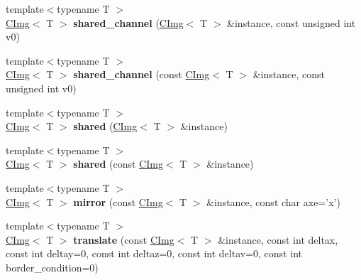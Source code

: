 \begin{DoxyCompactItemize}
\item 
\hypertarget{namespacecimg__library_a3cf8798c4859b85adbf80642a5ea70a3}{{\footnotesize template$<$typename T $>$ }\\\hyperlink{structcimg__library_1_1_c_img}{C\-Img}$<$ T $>$ {\bfseries shared\-\_\-channel} (\hyperlink{structcimg__library_1_1_c_img}{C\-Img}$<$ T $>$ \&instance, const unsigned int v0)}\label{namespacecimg__library_a3cf8798c4859b85adbf80642a5ea70a3}

\item 
\hypertarget{namespacecimg__library_a1eab13b0425b40f92a78431ef40ba42f}{{\footnotesize template$<$typename T $>$ }\\\hyperlink{structcimg__library_1_1_c_img}{C\-Img}$<$ T $>$ {\bfseries shared\-\_\-channel} (const \hyperlink{structcimg__library_1_1_c_img}{C\-Img}$<$ T $>$ \&instance, const unsigned int v0)}\label{namespacecimg__library_a1eab13b0425b40f92a78431ef40ba42f}

\item 
\hypertarget{namespacecimg__library_aaa0930fc6ee428defac1c96c777bc59a}{{\footnotesize template$<$typename T $>$ }\\\hyperlink{structcimg__library_1_1_c_img}{C\-Img}$<$ T $>$ {\bfseries shared} (\hyperlink{structcimg__library_1_1_c_img}{C\-Img}$<$ T $>$ \&instance)}\label{namespacecimg__library_aaa0930fc6ee428defac1c96c777bc59a}

\item 
\hypertarget{namespacecimg__library_a31792efab06c072bcdba1694dc474ace}{{\footnotesize template$<$typename T $>$ }\\\hyperlink{structcimg__library_1_1_c_img}{C\-Img}$<$ T $>$ {\bfseries shared} (const \hyperlink{structcimg__library_1_1_c_img}{C\-Img}$<$ T $>$ \&instance)}\label{namespacecimg__library_a31792efab06c072bcdba1694dc474ace}

\item 
\hypertarget{namespacecimg__library_acdc2977bcc13e616cafed7a6b3554eeb}{{\footnotesize template$<$typename T $>$ }\\\hyperlink{structcimg__library_1_1_c_img}{C\-Img}$<$ T $>$ {\bfseries mirror} (const \hyperlink{structcimg__library_1_1_c_img}{C\-Img}$<$ T $>$ \&instance, const char axe='x')}\label{namespacecimg__library_acdc2977bcc13e616cafed7a6b3554eeb}

\item 
\hypertarget{namespacecimg__library_a3c8242f4cdc4155b2d4c93323da7a515}{{\footnotesize template$<$typename T $>$ }\\\hyperlink{structcimg__library_1_1_c_img}{C\-Img}$<$ T $>$ {\bfseries translate} (const \hyperlink{structcimg__library_1_1_c_img}{C\-Img}$<$ T $>$ \&instance, const int deltax, const int deltay=0, const int deltaz=0, const int deltav=0, const int border\-\_\-condition=0)}\label{namespacecimg__library_a3c8242f4cdc4155b2d4c93323da7a515}


\end{DoxyCompactItemize}
